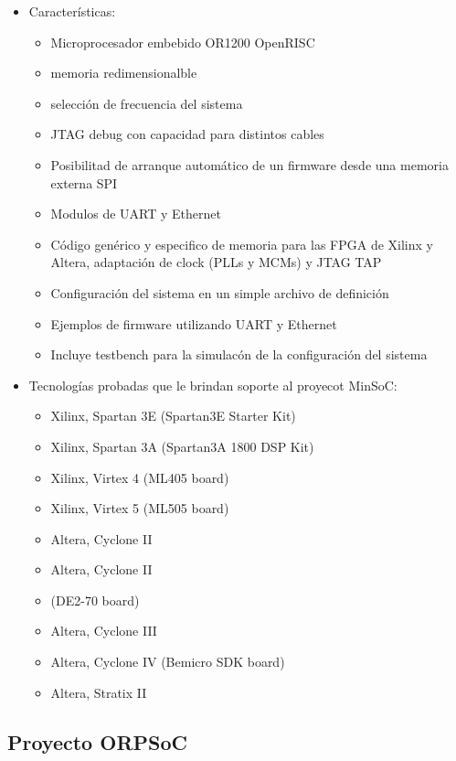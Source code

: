 \begin{itemize}
\item Características:
				\begin{itemize}
				  \item Microprocesador embebido OR1200 OpenRISC 
				  \item memoria redimensionalble
				  \item selección de frecuencia del sistema
				  \item JTAG debug con capacidad para distintos cables
				  \item Posibilitad de arranque automático de un firmware desde una memoria externa SPI
				  \item Modulos de UART y Ethernet 
				  \item Código genérico y especifico de memoria para las FPGA de Xilinx y Altera, adaptación de clock (PLLs y MCMs) y JTAG TAP
				  \item Configuración del sistema en un simple archivo de definición 
				  \item Ejemplos de firmware utilizando UART y Ethernet  
				  \item Incluye testbench para la simulacón de la configuración del sistema						
				\end{itemize}

\item Tecnologías probadas que le brindan soporte al proyecot MinSoC:


\begin{itemize}
				  \item Xilinx, Spartan 3E (Spartan3E Starter Kit)
				  \item Xilinx, Spartan 3A (Spartan3A 1800 DSP Kit)
				  \item Xilinx, Virtex 4 (ML405 board)
				  \item Xilinx, Virtex 5 (ML505 board)
				  \item Altera, Cyclone II
				  \item Altera, Cyclone II
				  \item (DE2-70 board)
				  \item Altera, Cyclone III
				  \item Altera, Cyclone IV (Bemicro SDK board) 
				  \item Altera, Stratix II						
				\end{itemize}
\end{itemize}

\newpage
				\subsection{Proyecto ORPSoC}

